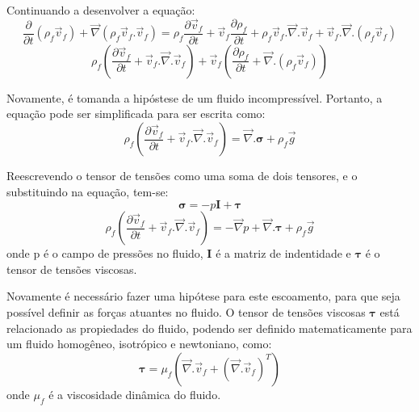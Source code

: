 Continuando a desenvolver a equação:
\begin{equation}
    \dfrac{\partial}{\partial t} (\rho_f \vec{v}_f) + 
    \vec{\nabla}(\rho_f \vec{v}_f.\vec{v}_f) =
    \rho_f \dfrac{\partial \vec{v}_f}{\partial t} + 
    \vec{v}_f \dfrac{\partial \rho_f}{\partial t} + 
    \rho_f \vec{v}_f.\vec{\nabla}.\vec{v}_f +
    \vec{v}_f.\vec{\nabla}.(\rho_f \vec{v}_f)
    \label{cons_qmov_ini}
\end{equation}
\begin{equation}
    \rho_f \left(
    	\dfrac{\partial \vec{v}_f}{\partial t} +
    	\vec{v}_f.\vec{\nabla}.\vec{v}_f 
	\right) +
	\vec{v}_f \left(
    	\dfrac{\partial \rho_f}{\partial t} +
    	\vec{\nabla}.(\rho_f \vec{v}_f)
	\right)
    \label{cons_qmov_mid}
\end{equation}

Novamente, é tomanda a hipóstese de um fluido incompressível.
Portanto, a equação pode ser simplificada para ser escrita como:
\begin{equation}
    \rho_f \left(
    	\dfrac{\partial \vec{v}_f}{\partial t} + 
    	\vec{v}_f.\vec{\nabla}.\vec{v}_f
	\right) =
    \vec{\nabla}.\boldsymbol{\sigma} +
    \rho_f \vec{g}
    \label{cons_qmov_fin}
\end{equation}

Reescrevendo o tensor de tensões como uma soma de dois tensores, e o substituindo na equação, tem-se:
\begin{equation}
    \boldsymbol{\sigma} = -p\mathbf{I} + \boldsymbol{\tau}
    \label{sigma}
\end{equation}
\begin{equation}
    \rho_f \left(
    	\dfrac{\partial \vec{v}_f}{\partial t} + 
    	\vec{v}_f.\vec{\nabla}.\vec{v}_f
	\right) =
    -\vec{\nabla}p +
    \vec{\nabla}.\boldsymbol{\tau} +
    \rho_f \vec{g}
    \label{cons_qmov_tensor}
\end{equation}
onde p é o campo de pressões no fluido, $\mathbf{I}$ é a matriz de indentidade e $\boldsymbol{\tau}$ é o tensor de tensões viscosas.

Novamente é necessário fazer uma hipótese para este escoamento, para que seja possível definir as forças atuantes no fluido. 
O tensor de tensões viscosas $\boldsymbol{\tau}$ está relacionado as propiedades do fluido, podendo ser definido matematicamente para um fluido homogêneo, isotrópico e newtoniano, como:
\begin{equation}
    \boldsymbol{\tau} = \mu_f\left(\vec{\nabla}.\vec{v}_f + \left(\vec{\nabla}.\vec{v}_f \right)^T \right)
    \label{tau}
\end{equation}
onde $\mu_f$ é a viscosidade dinâmica do fluido.

